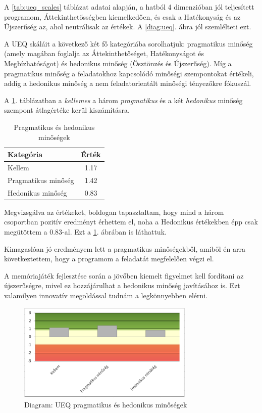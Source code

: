 A \ref{tab:ueq_scales} táblázat adatai alapján, a hatból 4 dimenzióban jól teljesített  programom, Áttekinthetősségben kiemelkedően, és csak a Hatékonyság és az Újszerűség az, ahol neutrálisak az értékek. A \ref{diag:ueq}. ábra jól szemlélteti ezt. 


A UEQ skáláit a következő két fő kategóriába sorolhatjuk: pragmatikus minőség (amely magában foglalja az Áttekinthetőséget, Hatékonyságot és Megbízhatóságot) és hedonikus minőség (Ösztönzés és Újszerűség). 
Míg a pragmatikus minőség a feladatokhoz kapcsolódó minőségi szempontokat értékeli, addig a hedonikus minőség a nem feladatorientált minőségi tényezőkre fókuszál.

A \ref{tab:pragmatic_hedonic_quality}. táblázatban a \textit{kellemes} a három \textit{pragmatikus} és a két \textit{hedonikus} minőség szempont átlagértéke kerül kiszámításra. 

\begin{table}[h]
    \centering
    \caption{Pragmatikus és hedonikus minőségek}
    \begin{tabular}{|l|c|}
        \hline
        \textbf{Kategória} & \textbf{Érték} \\ \hline
        Kellem & 1.17 \\ \hline
        Pragmatikus minőség & 1.42 \\ \hline
        Hedonikus minőség & 0.83 \\ \hline
    \end{tabular}
    \label{tab:pragmatic_hedonic_quality}
\end{table}

Megvizsgálva az értékeket, boldogan tapasztaltam, hogy mind a három csoportban pozitív eredményt érhettem el, noha a Hedonikus értékekben épp csak megütöttem a 0.83-al. Ezt a \ref{diag:pragmatic_hedonic}. ábrában is láthattuk.

Kimagaslóan jó eredményem lett a pragmatikus minőségekből, amiből én arra következtettem, hogy a programom a feladatát megfelelően végzi el. 

A memóriajáték fejlesztése során a jövőben kiemelt figyelmet kell fordítani az újszerűségre, mivel ez hozzájárulhat a hedonikus minőség javításához is. Ezt valamilyen innovatív megoldással tudnám a legkönnyebben elérni.

\begin{figure}[h]
    \center
    \includegraphics[width=0.75\textwidth]{img/UEQ_pragmatic_hedonic.png}
    \caption{Diagram: UEQ pragmatikus és hedonikus minőségek}
    \label{diag:pragmatic_hedonic}
\end{figure}

